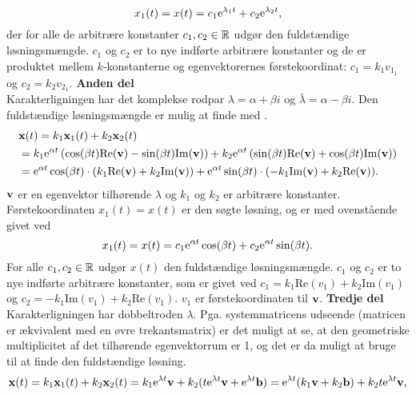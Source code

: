 \begin{bevis}
\begin{equation}
x_1(t) = x(t) = c_1 \mathrm{e}^{\lambda_1 t} + c_2 \mathrm{e}^{\lambda_2 t},
\end{equation}
der for alle de arbitrære konstanter $ c_1,c_2 \in \mathbb{R} $ udgør den fuldstændige løsningsmængde. $ c_1 $ og $ c_2 $ er to nye indførte arbitrære konstanter og de er produktet mellem $ k $-konstanterne og egenvektorernes førstekoordinat: $ c_1 = k_1 v_{1_1} $ og $ c_2 = k_2 v_{2_1} $.\bs
\textbf{Anden del} \\
Karakterligningen har det komplekse rodpar $ \lambda = \alpha + \beta i $ og $ \bar{\lambda} = \alpha - \beta i $. Den fuldstændige løsningsmængde er mulig at finde med .
\begin{equation}
\begin{aligned}
&\mathbf{x}(t) = k_1 \mathbf{x}_1(t) + k_2 \mathbf{x}_2(t) \\
&= k_1 \mathrm{e}^{\alpha t} \left(\cos(\beta t) \mathrm{Re}(\mathbf{v}) - \sin(\beta t) \mathrm{Im}(\mathbf{v}) \right) + k_2 \mathrm{e}^{\alpha t} \left(\sin(\beta t) \mathrm{Re}(\mathbf{v}) + \cos(\beta t) \mathrm{Im}(\mathbf{v}) \right) \\
&= \mathrm{e}^{\alpha t} \cos(\beta t) \cdot (k_1 \mathrm{Re}(\mathbf{v}) + k_2 \mathrm{Im}(\mathbf{v})) + \mathrm{e}^{\alpha t} \sin(\beta t) \cdot (-k_1 \mathrm{Im}(\mathbf{v}) + k_2 \mathrm{Re}(\mathbf{v})).
\end{aligned}
\end{equation}
$ \mathbf{v} $ er en egenvektor tilhørende $ \lambda $ og $ k_1 $ og $ k_2 $ er arbitrære konstanter. Førstekoordinaten $ x_1(t) = x(t) $ er den søgte løsning, og er med ovenstående givet ved
\begin{equation}
x_1(t) = x(t) = c_1\mathrm{e}^{\alpha t}\cos(\beta t) + c_2\mathrm{e}^{\alpha t}\sin(\beta t).
\end{equation}
For alle $ c_1,c_2 \in \mathbb{R} $ udgør $ x(t) $ den fuldstændige løsningsmængde. $ c_1 $ og $ c_2 $ er to nye indførte arbitrære konstanter, som er givet ved $ c_1 = k_1 \mathrm{Re}(v_1) + k_2 \mathrm{Im}(v_1) $ og $ c_2 = -k_1 \mathrm{Im}(v_1) + k_2 \mathrm{Re}(v_1) $. $ v_1 $ er førstekoordinaten til $ \mathbf{v} $.\bs
\textbf{Tredje del} \\
Karakterligningen har dobbeltroden $ \lambda $. Pga. systemmatricens udseende (matricen er ækvivalent med en øvre trekantsmatrix) er det muligt at se, at den geometriske multiplicitet af det tilhørende egenvektorrum er 1, og det er da muligt at bruge  til at finde den fuldstændige løsning.
\begin{equation}
\mx(t) = k_1 \mx_1(t) + k_2 \mx_2(t) = k_1 \e^{\lambda t} \mv + k_2 (t \e^{\lambda t} \mv + \e^{\lambda t} \mb) = \e^{\lambda t} (k_1 \mv + k_2 \mb) + k_2 t \e^{\lambda t} \mv,

\end{equation}
\end{bevis}
